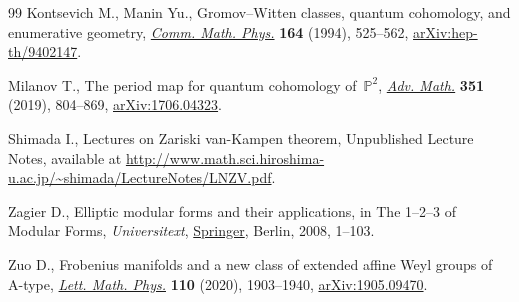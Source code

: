 \documentclass[pdftex]{sigma}
\numberwithin{equation}{section}
\begin{document}
\begin{thebibliography}{99}
Kontsevich M., Manin Yu., Gromov--{W}itten classes, quantum cohomology, and
 enumerative geometry, \href{https://doi.org/10.1007/BF02101490}{\textit{Comm.
 Math. Phys.}} \textbf{164} (1994), 525--562,
 \href{http://arxiv.org/abs/hep-th/9402147}{arXiv:hep-th/9402147}.

Milanov T., The period map for quantum cohomology of~{$\mathbb{P}^2$},
 \href{https://doi.org/10.1016/j.aim.2019.05.011}{\textit{Adv. Math.}}
 \textbf{351} (2019), 804--869,
 \href{http://arxiv.org/abs/1706.04323}{arXiv:1706.04323}.

Shimada I., Lectures on {Z}ariski van-{K}ampen theorem, {U}npublished Lecture
 Notes, available at
 \url{http://www.math.sci.hiroshima-u.ac.jp/~shimada/LectureNotes/LNZV.pdf}.

Zagier D., Elliptic modular forms and their applications, in The 1--2--3 of
 {M}odular {F}orms, \textit{Universitext},
 \href{https://doi.org/10.1007/978-3-540-74119-0_1}{Springer}, Berlin, 2008,
 1--103.

Zuo D., Frobenius manifolds and a new class of extended affine {W}eyl groups of
 {A}-type, \href{https://doi.org/10.1007/s11005-020-01280-2}{\textit{Lett.
 Math. Phys.}} \textbf{110} (2020), 1903--1940,
 \href{http://arxiv.org/abs/1905.09470}{arXiv:1905.09470}.

\end{thebibliography}\LastPageEnding
\end{document}

